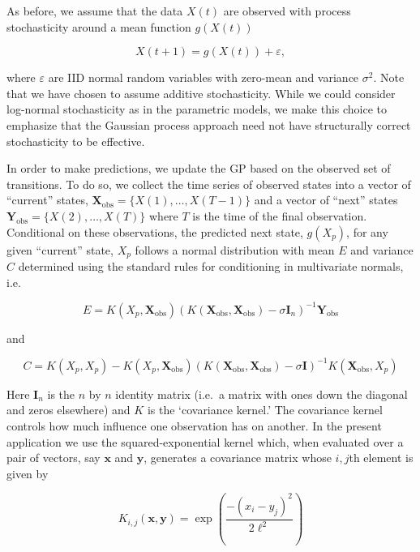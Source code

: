 \documentclass[author-year, 12pt,review]{components/elsarticle} %
\begin{document}
As before, we assume that the data $X(t)$ are observed with process
stochasticity around a mean function $g(X(t))$

\begin{equation}
X(t+1) = g(X(t)) + \varepsilon,
\end{equation}

where $\varepsilon$ are IID normal random variables with zero-mean and
variance $\sigma^2$. Note that we have chosen to assume additive
stochasticity. While we could consider log-normal stochasticity as in
the parametric models, we make this choice to emphasize that the
Gaussian process approach need not have structurally correct
stochasticity to be effective.

In order to make predictions, we update the GP based on the observed set
of transitions. To do so, we collect the time series of observed states
into a vector of ``current'' states,
$\mathbf{X}_{\textrm{obs}} = \{X(1), \dots, X(T-1)\}$ and a vector of
``next'' states $\mathbf{Y}_{\textrm{obs}} = \{X(2),\dots,X(T)\}$ where
$T$ is the time of the final observation. Conditional on these
observations, the predicted next state, $g(X_p)$, for any given
``current'' state, $X_p$ follows a normal distribution with mean $E$ and
variance $C$ determined using the standard rules for conditioning in
multivariate normals, i.e.

\begin{equation}
E = K(X_p, \mathbf{X}_{\textrm{obs}}) \left(K(\mathbf{X}_{\textrm{obs}},\mathbf{X}_{\textrm{obs}}) - \sigma \mathbf{I}_n \right)^{-1} \mathbf{Y}_{\textrm{obs}}
\end{equation}

and

\begin{equation}
C = K(X_p, X_p) - K(X_p, \mathbf{X}_{\textrm{obs}}) \left(K(\mathbf{X}_{\textrm{obs}},\mathbf{X}_{\textrm{obs}}) - \sigma \mathbf{I} \right)^{-1} K(\mathbf{X}_{\textrm{obs}}, X_p)
\end{equation}

Here $\mathbf{I}_n$ is the $n$ by $n$ identity matrix (i.e.~a matrix
with ones down the diagonal and zeros elsewhere) and $K$ is the
`covariance kernel.' The covariance kernel controls how much influence
one observation has on another. In the present application we use the
squared-exponential kernel which, when evaluated over a pair of vectors,
say $\mathbf{x}$ and $\mathbf{y}$, generates a covariance matrix whose
$i,j$th element is given by

\begin{equation}
K_{i,j}(\mathbf{x}, \mathbf{y}) = \exp\left( \frac{ -(x_i - y_j)^2}{2 \ell^2} \right)
\end{equation}
\end{document}
